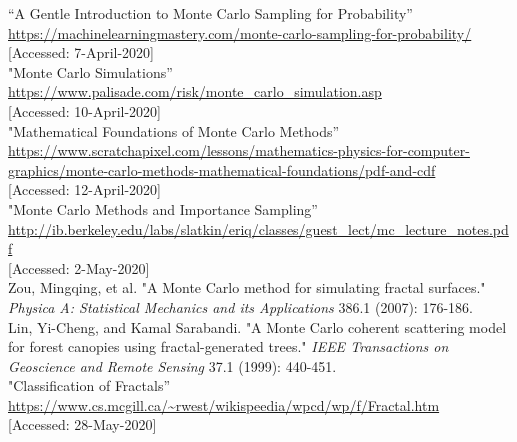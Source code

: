 \documentclass{resonance}
\begin{document}
\pagebreak
\setlength{\leftskip}{-4.2cm}
\begin{thebibliography}{99}

\vspace{5pt}
\setlength{\leftskip}{-3.8cm}
“A Gentle Introduction to Monte Carlo Sampling for Probability”\\ \textcolor{blue}{\url{https://machinelearningmastery.com/monte-carlo-sampling-for-probability/}}\\
{[Accessed: 7-April-2020]}\\

"Monte Carlo Simulations”\\ \textcolor{blue}{\url{https://www.palisade.com/risk/monte_carlo_simulation.asp}}\\
{[Accessed: 10-April-2020]}\\

"Mathematical Foundations of Monte Carlo Methods”\\ \textcolor{blue}{\url{https://www.scratchapixel.com/lessons/mathematics-physics-for-computer-graphics/monte-carlo-methods-mathematical-foundations/pdf-and-cdf}}\\
{[Accessed: 12-April-2020]}\\

"Monte Carlo Methods and Importance Sampling”\\ \textcolor{blue}{\url{http://ib.berkeley.edu/labs/slatkin/eriq/classes/guest\_lect/mc\_lecture\_notes.pdf }}\\
{[Accessed: 2-May-2020]}\\

Zou, Mingqing, et al. "A Monte Carlo method for simulating fractal surfaces." \textit{Physica A: Statistical Mechanics and its Applications} 386.1 (2007): 176-186.\\

Lin, Yi-Cheng, and Kamal Sarabandi. "A Monte Carlo coherent scattering model for forest canopies using fractal-generated trees." \textit{IEEE Transactions on Geoscience and Remote Sensing} 37.1 (1999): 440-451.\\

"Classification of Fractals”\\ \textcolor{blue}{\url{https://www.cs.mcgill.ca/~rwest/wikispeedia/wpcd/wp/f/Fractal.htm}}\\
{[Accessed: 28-May-2020]}\\


\end{thebibliography}
\end{document}
